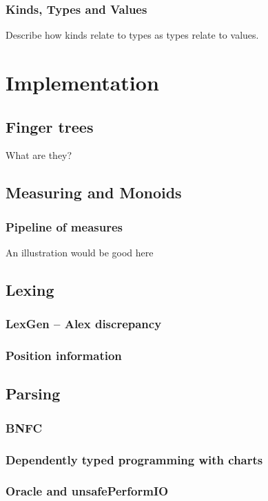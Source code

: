 \documentclass[a4paper,12pt,twosided]{report}
\begin{document}
\subsection{Kinds, Types and Values}
Describe how kinds relate to types as types relate to values.

%
%

\chapter{Implementation}

\section{Finger trees}
What are they?
\section{Measuring and Monoids}

\subsection{Pipeline of measures}
An illustration would be good here

\section{Lexing}
\subsection{LexGen -- Alex discrepancy}
\subsection{Position information}

\section{Parsing}
\subsection{BNFC}
\subsection{Dependently typed programming with charts}
\subsection{Oracle and unsafePerformIO}
\end{document}

